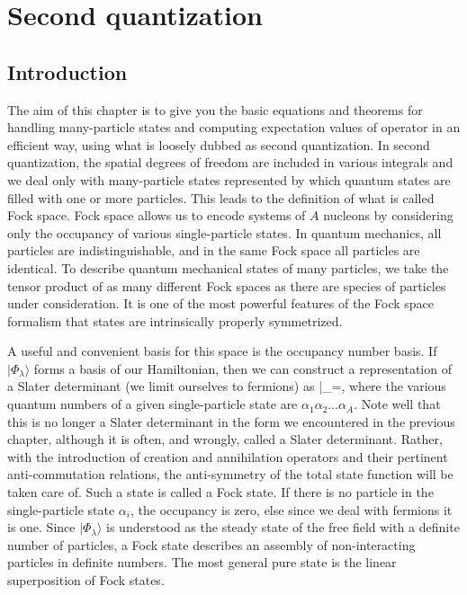 \chapter{Second quantization}

\section{Introduction}

The aim of this chapter is to give you the basic equations and
theorems for handling many-particle states and computing expectation
values of operator in an efficient way, using what is loosely dubbed
as second quantization.  In second quantization, the spatial degrees
of freedom are included in various integrals and we deal only with
many-particle states represented by which quantum states are filled
with one or more particles. This leads to the definition of what is
called Fock space.  Fock space allows us to encode systems of $A$
nucleons by considering only the occupancy of various single-particle
states. In quantum mechanics, all particles are indistinguishable, and
in the same Fock space all particles are identical. To describe
quantum mechanical states of many particles, we take the tensor
product of as many different Fock spaces as there are species of
particles under consideration.  It is one of the most powerful
features of the Fock space formalism that states are intrinsically
properly symmetrized.

A useful and convenient basis for this space is the occupancy number basis. 
If $|\Phi_{\lambda}\rangle$ forms a  basis of our Hamiltonian, 
then we can construct a representation of a Slater determinant (we limit ourselves to fermions) as
\be
|\Phi_{\lambda}\rangle=,\ee
where the various quantum numbers of a given single-particle state are $\alpha_1\alpha_2 \hdots \alpha_{A}$.
Note well that this is no longer a Slater determinant in the form we encountered in the previous chapter, although it is often, and wrongly, called a Slater determinant. Rather, with the introduction
of creation and annihilation operators and their pertinent anti-commutation relations, the anti-symmetry of the total state function will be
 taken
care of. 
Such a state is called a Fock state. 
If there is no particle in the single-particle state $\alpha_i$, the occupancy is zero, else since we  deal with fermions it is one. 
Since $|\Phi_{\lambda}\rangle$ is understood as the steady state of 
the free field with a definite number of particles, a Fock state describes an assembly of 
non-interacting particles in definite numbers. The most general pure state is the linear superposition of Fock states.

